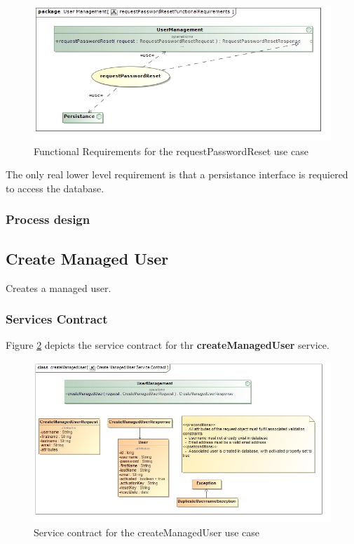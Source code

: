 \begin{figure}[H]
	\begin{center}
		\includegraphics[scale=0.55]{../Diagrams and Charts/Users/requestPasswordResetFunctionalRequirements.jpg}
		\caption{Functional Requirements for the requestPasswordReset use case}
		\label{fig:requestPasswordResetFR}
	\end{center}
\end{figure}

The only real lower level requirement is that a persistance interface is requiered
to access the database.

\subsubsection{Process design}

\subsection{Create Managed User}
Creates a managed user.

\subsubsection{Services Contract}
Figure \ref{fig:createManagedUserServicesContract} depicts the service contract for thr \textbf{createManagedUser} service.

\begin{figure}[H]
	\begin{center}
		\includegraphics[scale=0.55]{../Diagrams and Charts/Users/Create Managed User Service Contract.jpg}
		\caption{Service contract for the createManagedUser use case}
		\label{fig:createManagedUserServicesContract}
	\end{center}
\end{figure}

